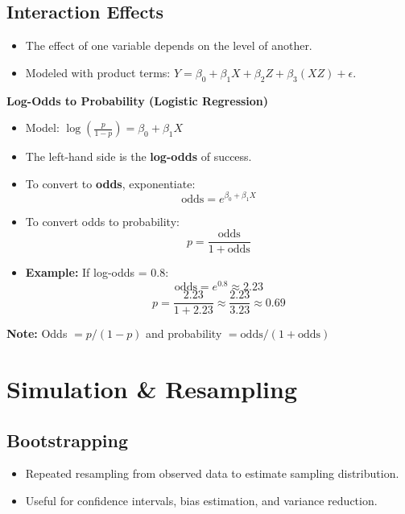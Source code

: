 \documentclass[10pt, landscape]{article}
\begin{document}
\begin{multicols}{3}
\subsection{Interaction Effects}
\begin{itemize}[noitemsep]
    \item The effect of one variable depends on the level of another.
    \item Modeled with product terms: \( Y = \beta_0 + \beta_1X + \beta_2Z + \beta_3(XZ) + \epsilon \).
\end{itemize}

\vspace{0.5em}
\textbf{Log-Odds to Probability (Logistic Regression)}

\begin{itemize}[noitemsep]
    \item Model: \( \log\left(\frac{p}{1 - p}\right) = \beta_0 + \beta_1X \)
    \item The left-hand side is the \textbf{log-odds} of success.
    \item To convert to \textbf{odds}, exponentiate: 
    \[
    \text{odds} = e^{\beta_0 + \beta_1X}
    \]
    \item To convert odds to probability:
    \[
    p = \frac{\text{odds}}{1 + \text{odds}}
    \]
    \item \textbf{Example:} If log-odds = 0.8:
    \[
    \text{odds} = e^{0.8} \approx 2.23
    \]
    \[
    p = \frac{2.23}{1 + 2.23} \approx \frac{2.23}{3.23} \approx 0.69
    \]
\end{itemize}
\textbf{Note:} Odds \(= p / (1 - p)\) and probability \(= \text{odds} / (1 + \text{odds})\)



\section{Simulation \& Resampling}

\subsection{Bootstrapping}
\begin{itemize}[noitemsep]
    \item Repeated resampling from observed data to estimate sampling distribution.
    \item Useful for confidence intervals, bias estimation, and variance reduction.
\end{itemize}


\end{multicols}
\end{document}
